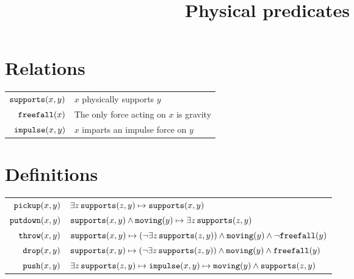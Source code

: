 \documentclass{article}
\title{Physical predicates}
\newcommand{\urel}[2]{\text{\texttt{#1}}(#2)}
\newcommand{\brel}[3]{\text{\texttt{#1}}(#2,#3)}
\begin{document}
  \maketitle
\section{Relations}
\begin{tabular}{r|l}
  $ \brel{supports}{x}{y} $ & $x$ physically supports $y$ \\
  $ \urel{freefall}{x} $ & The only force acting on $x$ is gravity \\
  $ \brel{impulse}{x}{y} $ & $x$ imparts an impulse force on $y$ \\
\end{tabular}
\section{Definitions}
\begin{tabular}{r|l}
  $\brel{pickup}{x}{y}$ & $\exists z\,\brel{supports}{z}{y}\mapsto\brel{supports}{x}{y}$ \\
  $\brel{putdown}{x}{y}$ & $\brel{supports}{x}{y} \land \urel{moving}{y} \mapsto \exists z\, \brel{supports}{z}{y}$\\
  $\brel{throw}{x}{y}$ & $\brel{supports}{x}{y}\mapsto (\lnot \exists z\, \brel{supports}{z}{y}) \land \urel{moving}{y} \land \lnot \urel{freefall}{y}$ \\
  $\brel{drop}{x}{y}$ & $\brel{supports}{x}{y}\mapsto (\lnot \exists z\, \brel{supports}{z}{y}) \land \urel{moving}{y} \land \urel{freefall}{y}$ \\
  $\brel{push}{x}{y}$ & $\exists z\,\brel{supports}{z}{y}\mapsto\brel{impulse}{x}{y}\mapsto\urel{moving}{y}\land\brel{supports}{z}{y}$\\


\end{tabular}
\end{document}
